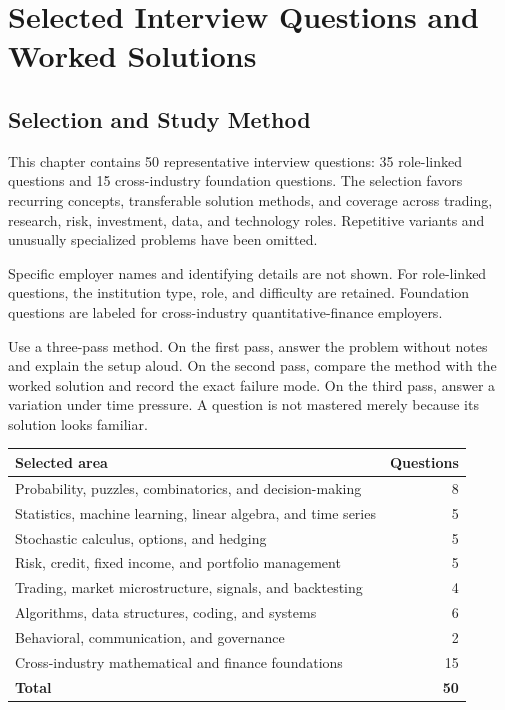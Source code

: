 \documentclass[11pt,letterpaper,openany]{book}
\begin{document}
\chapter{Selected Interview Questions and Worked Solutions}

\section{Selection and Study Method}
This chapter contains 50 representative interview questions: 35 role-linked questions and 15 cross-industry foundation questions. The selection favors recurring concepts, transferable solution methods, and coverage across trading, research, risk, investment, data, and technology roles. Repetitive variants and unusually specialized problems have been omitted.

Specific employer names and identifying details are not shown. For role-linked questions, the institution type, role, and difficulty are retained. Foundation questions are labeled for cross-industry quantitative-finance employers.

Use a three-pass method. On the first pass, answer the problem without notes and explain the setup aloud. On the second pass, compare the method with the worked solution and record the exact failure mode. On the third pass, answer a variation under time pressure. A question is not mastered merely because its solution looks familiar.

\begin{longtable}{@{}L{0.58\textwidth}r@{}}
\toprule
\textbf{Selected area} & \textbf{Questions} \\
\midrule
Probability, puzzles, combinatorics, and decision-making & 8 \\
Statistics, machine learning, linear algebra, and time series & 5 \\
Stochastic calculus, options, and hedging & 5 \\
Risk, credit, fixed income, and portfolio management & 5 \\
Trading, market microstructure, signals, and backtesting & 4 \\
Algorithms, data structures, coding, and systems & 6 \\
Behavioral, communication, and governance & 2 \\
Cross-industry mathematical and finance foundations & 15 \\
\midrule
\textbf{Total} & \textbf{50} \\
\bottomrule
\end{longtable}
\end{document}
